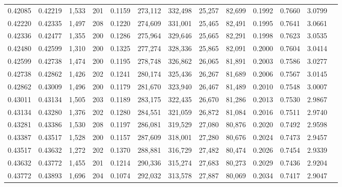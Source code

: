 \begin{tabular}{rrrrrrrrrrrrr}
0.42085 & 0.42219 & 1,533 & 201 &                                     0.1159 & 273,112 & 332,498 &  25,257 &  82,699 & 0.1992 & 0.7660 & 3.0799 \\
0.42220 & 0.42335 & 1,497 & 208 &                                     0.1220 & 274,609 & 331,001 &  25,465 &  82,491 & 0.1995 & 0.7641 & 3.0661 \\
0.42336 & 0.42477 & 1,355 & 200 &                                     0.1286 & 275,964 & 329,646 &  25,665 &  82,291 & 0.1998 & 0.7623 & 3.0535 \\
0.42480 & 0.42599 & 1,310 & 200 &                                     0.1325 & 277,274 & 328,336 &  25,865 &  82,091 & 0.2000 & 0.7604 & 3.0414 \\
0.42599 & 0.42738 & 1,474 & 200 &                                     0.1195 & 278,748 & 326,862 &  26,065 &  81,891 & 0.2003 & 0.7586 & 3.0277 \\
0.42738 & 0.42862 & 1,426 & 202 &                                     0.1241 & 280,174 & 325,436 &  26,267 &  81,689 & 0.2006 & 0.7567 & 3.0145 \\
0.42862 & 0.43009 & 1,496 & 200 &                                     0.1179 & 281,670 & 323,940 &  26,467 &  81,489 & 0.2010 & 0.7548 & 3.0007 \\
0.43011 & 0.43134 & 1,505 & 203 &                                     0.1189 & 283,175 & 322,435 &  26,670 &  81,286 & 0.2013 & 0.7530 & 2.9867 \\
0.43134 & 0.43280 & 1,376 & 202 &                                     0.1280 & 284,551 & 321,059 &  26,872 &  81,084 & 0.2016 & 0.7511 & 2.9740 \\
0.43281 & 0.43386 & 1,530 & 208 &                                     0.1197 & 286,081 & 319,529 &  27,080 &  80,876 & 0.2020 & 0.7492 & 2.9598 \\
0.43387 & 0.43517 & 1,528 & 200 &                                     0.1157 & 287,609 & 318,001 &  27,280 &  80,676 & 0.2024 & 0.7473 & 2.9457 \\
0.43517 & 0.43632 & 1,272 & 202 &                                     0.1370 & 288,881 & 316,729 &  27,482 &  80,474 & 0.2026 & 0.7454 & 2.9339 \\
0.43632 & 0.43772 & 1,455 & 201 &                                     0.1214 & 290,336 & 315,274 &  27,683 &  80,273 & 0.2029 & 0.7436 & 2.9204 \\
0.43772 & 0.43893 & 1,696 & 204 &                                     0.1074 & 292,032 & 313,578 &  27,887 &  80,069 & 0.2034 & 0.7417 & 2.9047 \\

\end{tabular}
